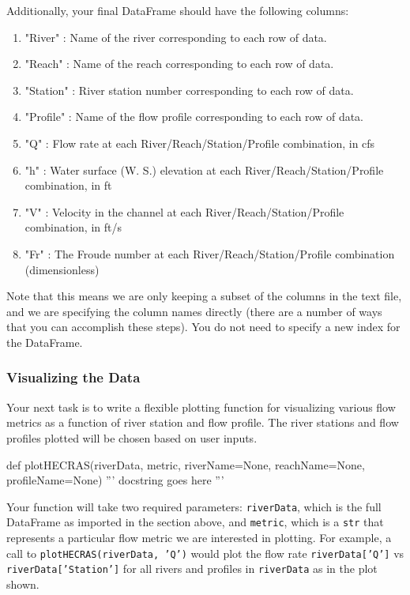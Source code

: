 \documentclass{homework}
\begin{document}
Additionally, your final DataFrame should have the following columns:
\begin{enumerate}
    \itemsep0em 
    \item "River" : Name of the river corresponding to each row of data.
    \item "Reach" : Name of the reach corresponding to each row of data.
    \item "Station" : River station number corresponding to each row of data.
    \item "Profile" : Name of the flow profile corresponding to each row of data.
    \item "Q" : Flow rate at each River/Reach/Station/Profile combination, in cfs
    \item "h" : Water surface (W. S.) elevation at each River/Reach/Station/Profile combination, in ft
    \item "V" : Velocity in the channel at each River/Reach/Station/Profile combination, in ft/s
    \item "Fr" : The Froude number at each River/Reach/Station/Profile combination (dimensionless)
\end{enumerate}
Note that this means we are only keeping a subset of the columns in the text file, and we are specifying the column names directly (there are a number of ways that you can accomplish these steps). You do not need to specify a new index for the DataFrame.

\subsubsection*{Visualizing the Data}

Your next task is to write a flexible plotting function for visualizing various flow metrics as a function of river station and flow profile. The river stations and flow profiles plotted will be chosen based on user inputs.

\begin{python}
def plotHECRAS(riverData, metric, riverName=None, reachName=None, profileName=None)
    ''' docstring goes here '''
\end{python}

Your function will take two required parameters: \texttt{riverData}, which is the full DataFrame as imported in the section above, and \texttt{metric}, which is a \texttt{str} that represents a particular flow metric we are interested in plotting. For example, a call to \texttt{plotHECRAS(riverData, 'Q')} would plot the flow rate \texttt{riverData['Q']} vs \texttt{riverData['Station']} for all rivers and profiles in \texttt{riverData} as in the plot shown.
\end{document}
